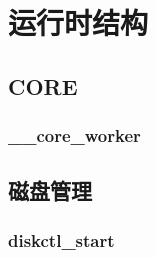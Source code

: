 \chapter{运行时结构}

\section{CORE}

\subsection{\_\_core\_worker}

\section{磁盘管理}

\subsection{diskctl\_start}
